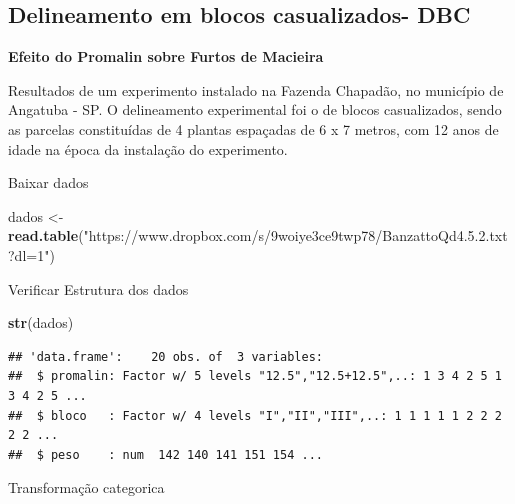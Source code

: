 \documentclass[
]{book}
\newenvironment{Shaded}{\begin{snugshade}}{\end{snugshade}}
\newcommand{\KeywordTok}[1]{\textcolor[rgb]{0.13,0.29,0.53}{\textbf{#1}}}
\newcommand{\NormalTok}[1]{#1}
\newcommand{\OperatorTok}[1]{\textcolor[rgb]{0.81,0.36,0.00}{\textbf{#1}}}
\newcommand{\StringTok}[1]{\textcolor[rgb]{0.31,0.60,0.02}{#1}}
\begin{document}
\hypertarget{delineamento-em-blocos-casualizados--dbc}{%
\subsection{Delineamento em blocos casualizados- DBC}\label{delineamento-em-blocos-casualizados--dbc}}

\textbf{Efeito do Promalin sobre Furtos de Macieira}

Resultados de um experimento instalado na Fazenda Chapadão, no município de Angatuba - SP. O delineamento experimental foi o de blocos casualizados, sendo as parcelas constituídas de 4 plantas espaçadas de 6 x 7 metros, com 12 anos de idade na época da instalação do experimento.

Baixar dados

\begin{Shaded}
\begin{Highlighting}[]
\NormalTok{dados <-}\StringTok{ }\KeywordTok{read.table}\NormalTok{(}\StringTok{"https://www.dropbox.com/s/9woiye3ce9twp78/BanzattoQd4.5.2.txt?dl=1"}\NormalTok{)}
\end{Highlighting}
\end{Shaded}

Verificar Estrutura dos dados

\begin{Shaded}
\begin{Highlighting}[]
\KeywordTok{str}\NormalTok{(dados)}
\end{Highlighting}
\end{Shaded}

\begin{verbatim}
## 'data.frame':    20 obs. of  3 variables:
##  $ promalin: Factor w/ 5 levels "12.5","12.5+12.5",..: 1 3 4 2 5 1 3 4 2 5 ...
##  $ bloco   : Factor w/ 4 levels "I","II","III",..: 1 1 1 1 1 2 2 2 2 2 ...
##  $ peso    : num  142 140 141 151 154 ...
\end{verbatim}

Transformação categorica

\begin{Shaded}
\end{Shaded}
\end{document}
